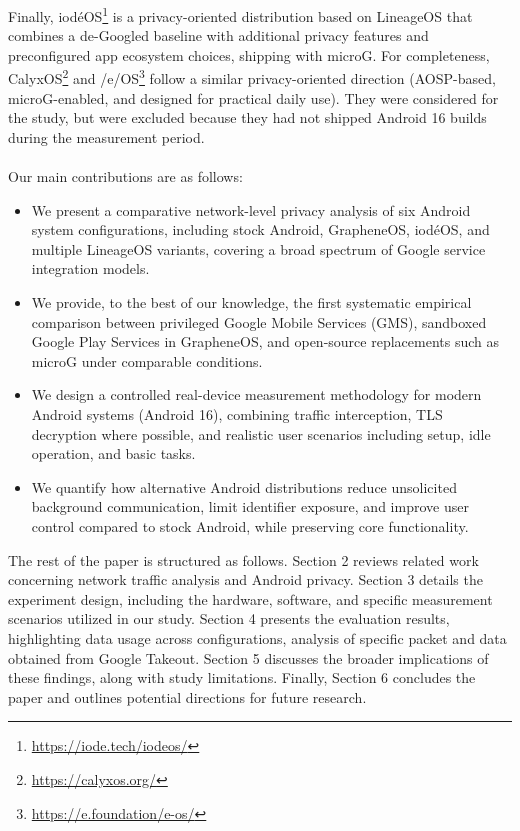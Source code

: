 \documentclass[runningheads]{llncs}
\begin{document}
Finally, iod\'eOS\footnote{\url{https://iode.tech/iodeos/}} is a privacy-oriented distribution based on LineageOS that combines a de-Googled baseline with additional privacy features and preconfigured app ecosystem choices, shipping with microG. For completeness, CalyxOS\footnote{\url{https://calyxos.org/}} and /e/OS\footnote{\url{https://e.foundation/e-os/}} follow a similar privacy-oriented direction (AOSP-based, microG-enabled, and designed for practical daily use). They were considered for the study, but were excluded because they had not shipped Android 16 builds during the measurement period.
\\
\\
\noindent Our main contributions are as follows: 
\begin{itemize}
	\item We present a comparative network-level privacy analysis of six Android system configurations, including stock Android, GrapheneOS, iod\'eOS, and multiple LineageOS variants, covering a broad spectrum of Google service integration models.
	\item We provide, to the best of our knowledge, the first systematic empirical comparison between privileged Google Mobile Services (GMS), sandboxed Google Play Services in GrapheneOS, and open-source replacements such as microG under comparable conditions.
	\item We design a controlled real-device measurement methodology for modern Android systems (Android 16), combining traffic interception, TLS decryption where possible, and realistic user scenarios including setup, idle operation, and basic tasks.
	\item We quantify how alternative Android distributions reduce unsolicited background communication, limit identifier exposure, and improve user control compared to stock Android, while preserving core functionality.
\end{itemize}

The rest of the paper is structured as follows. Section 2 reviews related work concerning network traffic analysis and Android privacy. Section 3 details the experiment design, including the hardware, software, and specific measurement scenarios utilized in our study. Section 4 presents the evaluation results, highlighting data usage across configurations, analysis of specific packet and data obtained from Google Takeout. Section 5 discusses the broader implications of these findings, along with study limitations. Finally, Section 6 concludes the paper and outlines potential directions for future research.
\end{document}
